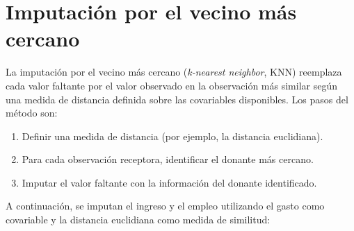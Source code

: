 \documentclass[
  spanish,
  12pt,
]{book}
\newenvironment{Shaded}{\begin{snugshade}}{\end{snugshade}}
\newcommand{\ControlFlowTok}[1]{\textcolor[rgb]{0.13,0.29,0.53}{\textbf{#1}}}
\newcommand{\DecValTok}[1]{\textcolor[rgb]{0.00,0.00,0.81}{#1}}
\newcommand{\FunctionTok}[1]{\textcolor[rgb]{0.13,0.29,0.53}{\textbf{#1}}}
\newcommand{\NormalTok}[1]{#1}
\newcommand{\OtherTok}[1]{\textcolor[rgb]{0.56,0.35,0.01}{#1}}
\newcommand{\SpecialCharTok}[1]{\textcolor[rgb]{0.81,0.36,0.00}{\textbf{#1}}}
\providecommand{\tightlist}{%
  \setlength{\itemsep}{0pt}\setlength{\parskip}{0pt}}
\begin{document}
\section{Imputación por el vecino más cercano}\label{sec-knn}

La imputación por el vecino más cercano (\emph{k-nearest neighbor}, KNN) reemplaza cada valor faltante por el valor observado en la observación más similar según una medida de distancia definida sobre las covariables disponibles. Los pasos del método son:

\begin{enumerate}
\def\labelenumi{\arabic{enumi}.}
\tightlist
\item
  Definir una medida de distancia (por ejemplo, la distancia euclidiana).
\item
  Para cada observación receptora, identificar el donante más cercano.
\item
  Imputar el valor faltante con la información del donante identificado.
\end{enumerate}

A continuación, se imputan el ingreso y el empleo utilizando el gasto como covariable y la distancia euclidiana como medida de similitud:

\begin{Shaded}
\end{Shaded}
\end{document}

